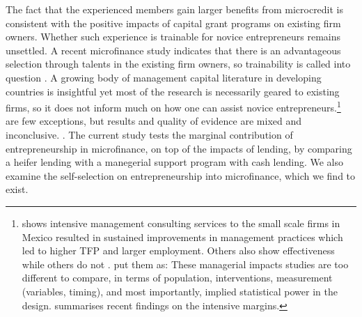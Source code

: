	The fact that the experienced members gain larger benefits from microcredit is consistent with the positive impacts of capital grant programs on existing firm owners. Whether such experience is trainable for novice entrepreneurs remains unsettled. A recent microfinance study indicates that there is an advantageous selection through talents in the existing firm owners, so trainability is called into question \citep{Banerjee2019MFPovertyTrap}. A growing body of management capital literature in developing countries is insightful yet most of the research is necessarily geared to existing firms, so it does not inform much on how one can assist novice entrepreneurs.\footnote{\citet{BruhnKarlanSchoar2018} shows intensive management consulting services to the small scale firms in Mexico resulted in sustained improvements in management practices which led to higher TFP and larger employment. Others also show effectiveness \citep{Calderon2011, Berge2012, Bloometal2013} while others do not \citep{Bruhn2012, KarlanKnightUdry2015}. \citet{MckenzieWoodruff2013} put them as: These managerial impacts studies are too different to compare, in terms of population, interventions, measurement (variables, timing), and most importantly, implied statistical power in the design. \citet{McKenzie2021} summarises recent findings on the intensive margins. } \citet{KarlanValvidia2011, BruhnZia2011, Argent2014} are few exceptions, but results and quality of evidence are mixed and inconclusive.  \citep{Blattman2014, Blattmanetal2016}. The current study tests the marginal contribution of entrepreneurship in microfinance, on top of the impacts of lending, by comparing a heifer lending with a manegerial support program with cash lending. We also examine the self-selection on entrepreneurship into microfinance, which we find to exist.%


